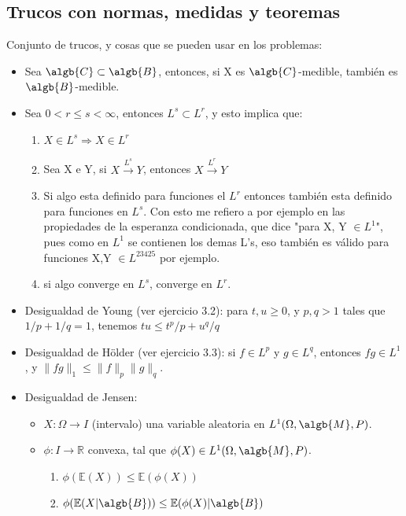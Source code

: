 \documentclass{apuntes}
\begin{document}
\subsection{Trucos con normas, medidas y teoremas}

Conjunto de trucos, y cosas que se pueden usar en los problemas:

\begin{itemize}
\item Sea $\algb{C} \subset \algb{B}$, entonces, si X es $\algb{C}$-medible, también es $\algb{B}$-medible.

\item Sea $0<r\leq s<\infty$, entonces $L^s \subset L^r$, y esto implica que:
\begin{enumerate}
\item  $X \in L^s \Rightarrow X \in L^r$
\item Sea X e Y, si $X \stackrel{L^s}{\rightarrow} Y$, entonces $X \stackrel{L^r}{\rightarrow} Y$
\item Si algo esta definido para funciones el $L^r$ entonces también esta definido para funciones en $L^s$. Con esto me refiero a por ejemplo en las propiedades de la esperanza condicionada, que dice "para X, Y $\in L^1$", pues como en $L^1$ se contienen los demas L's, eso también es válido para funciones X,Y $\in L^{23425}$ por ejemplo.
\item si algo converge en $L^s$, converge en $L^r$.
\end{enumerate}

\item Desigualdad de Young (ver ejercicio 3.2): para $t, u \ge 0$, y $p,q > 1$ tales que $1/p + 1/q =1$, tenemos $tu \le t^p/ p + u^q/ q$
\item Desigualdad de Hölder (ver ejercicio 3.3): si $f\in L^p$ y $g\in L^q$, entonces $fg\in L^1$, y $\|fg\|_1 \le \|f\|_p\|g\|_q$.
\item Desigualdad de Jensen:
\begin{itemize}
\item $X: \Omega \rightarrow I$ (intervalo) una variable aleatoria en $L^1(\Omega, \algb{M},P)$.
\item $\phi: I \rightarrow \mathbb{R}$ convexa, tal que $\phi(X) \in L^1(\Omega,\algb{M},P)$.
\begin{enumerate}
\item $\phi(\mathbb{E}(X)) \leq \mathbb{E}(\phi(X))$
\item $\phi(\mathbb{E}(X|\algb{B})) \leq \mathbb{E}(\phi(X)|\algb{B})$


\end{enumerate}
\end{itemize}
\end{itemize}
\end{document}
